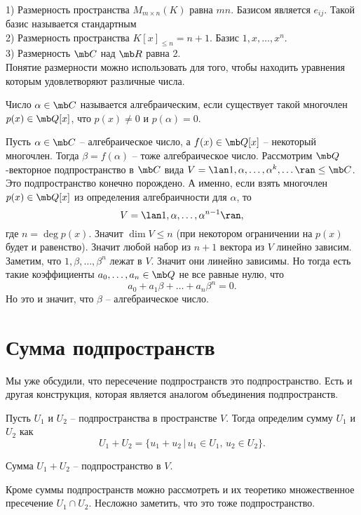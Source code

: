 \exm\\
1) Размерность пространства $M_{m\times n}(K)$ равна $mn$. Базисом является $e_{ij}$. Такой базис называется стандартным\\
2) Размерность пространства $K[x]_{\leq n}=n+1$. Базис $1,x,\dots,x^n$.\\
3) Размерность $\mb C$ над $\mb R$ равна 2.\\

Понятие размерности можно использовать для того, чтобы находить уравнения которым удовлетворяют различные числа.

\dfn Число $\alpha \in \mb C$ называется алгебраическим, если существует такой многочлен $p(x)\in \mb Q[x]$, что $p(x)\neq 0$ и $p(\alpha)=0$.
\edfn

\utv Пусть $\alpha \in \mb C$ -- алгебраическое число, а $f(x)\in \mb Q[x]$ -- некоторый многочлен. Тогда $\beta=f(\alpha)$ -- тоже алгебраическое число.
\eutv
\proof Рассмотрим $\mb Q$-векторное подпространство в $\mb C$ вида $V=\lan 1,\alpha,\dots,\alpha^k,\dots\ran \leq \mb C$. Это подпространство конечно порождено. А именно, если взять многочлен $p(x)\in \mb Q[x]$ из определения алгебраичности для $\alpha$, то 
$$V=\lan 1,\alpha,\dots, \alpha^{n-1}\ran,$$
где $n=\deg p(x)$. Значит $\dim V\leq n$ (при некотором ограничении на $p(x)$ будет и равенство). Значит любой набор из $n+1$ вектора из $V$ линейно зависим. Заметим, что $1,\beta,\dots,\beta^n$ лежат в $V$. Значит они линейно зависимы. Но тогда  есть такие коэффициенты $a_0,\dots,a_n\in \mb Q$ не все равные нулю, что $$a_0+a_1\beta+\dots+a_n\beta^n=0.$$
Но это и значит, что $\beta$ -- алгебраическое число. 
\endproof

\section{Сумма подпространств}

Мы уже обсудили, что пересечение подпространств это подпространство. Есть и другая конструкция, которая является аналогом объединения подпространств.

\dfn[Сумма] Пусть $U_1$ и $U_2$ -- подпространства в пространстве $V$. Тогда определим сумму $U_1$ и $U_2$ как 
$$U_1+U_2=\{u_1+u_2\,|\, u_1\in U_1, \,u_2\in U_2\}.$$
\edfn

\rm Сумма $U_1+U_2$ -- подпространство в $V$. \erm

\rm Кроме суммы подпространств можно рассмотреть и их теоретико множественное пресечение $U_1\cap U_2$. Несложно заметить, что это тоже подпространство. 
\erm

